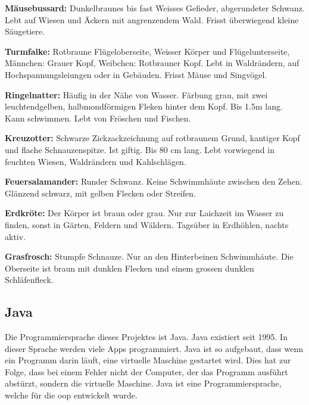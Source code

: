 \textbf{Mäusebussard: }Dunkelbraunes bis fast Weisses Gefieder, abgerundeter Schwanz. Lebt auf Wiesen und Äckern mit angrenzendem Wald. Frisst überwiegend kleine Säugetiere.\par

\textbf{Turmfalke: }Rotbraune Flügeloberseite, Weisser Körper und Flügelunterseite, Männchen: Grauer Kopf, Weibchen: Rotbrauner Kopf. Lebt in Waldrändern, auf Hochspannungsleiungen oder in Gebäuden. Frisst Mäuse und Singvögel.\par

\textbf{Ringelnatter: }Häufig in der Nähe von Wasser. Färbung grau, mit zwei leuchtendgelben, halbmondförmigen Fleken hinter dem Kopf. Bis 1.5m lang. Kann schwimmen. Lebt von Fröschen und Fischen.\par

\textbf{Kreuzotter: }Schwarze Zickzackzeichnung auf rotbraunem Grund, kantiger Kopf und flache Schnauzenspitze. Ist giftig. Bis 80 cm lang. Lebt vorwiegend in feuchten Wiesen, Waldrändern und Kahlschlägen. \par

\textbf{Feuersalamander: }Runder Schwanz. Keine Schwimmhäute zwischen den Zehen. Glänzend schwarz, mit gelben Flecken oder Streifen. \par

\textbf{Erdkröte: }Der Körper ist braun oder grau. Nur zur Laichzeit im Wasser zu finden, sonst in Gärten, Feldern und Wäldern. Tagsüber in Erdhöhlen, nachts aktiv. \par

\textbf{Grasfrosch: }Stumpfe Schnauze. Nur an den Hinterbeinen Schwimmhäute. Die Oberseite ist braun mit dunklen Flecken und einem grossen dunklen Schläfenfleck.


\subsection{Java}
Die Programmiersprache dieses Projektes ist Java. Java existiert seit 1995. In dieser Sprache werden viele Apps programmiert\cite{oa_what_nodate}. Java ist so aufgebaut, dass wenn ein Programm darin läuft, eine virtuelle Maschine gestartet wird. Dies hat zur Folge, dass bei einem Fehler nicht der Computer, der das Programm ausführt abstürzt, sondern die virtuelle Maschine\cite{wikipedia-autoren_java_2024}. Java ist eine Programmiersprache, welche für die \gls{oop} entwickelt wurde. 

